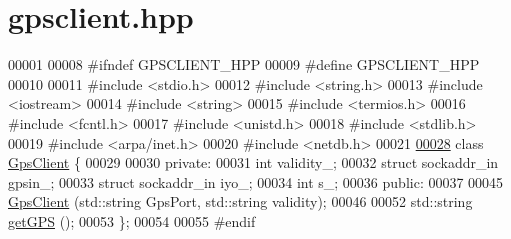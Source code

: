 \hypertarget{gpsclient_8hpp_source}{}\section{gpsclient.\+hpp}
\label{gpsclient_8hpp_source}

\begin{DoxyCode}
00001 
00008 \textcolor{preprocessor}{#ifndef GPSCLIENT\_HPP}
00009 \textcolor{preprocessor}{#define GPSCLIENT\_HPP}
00010 
00011 \textcolor{preprocessor}{#include <stdio.h>}
00012 \textcolor{preprocessor}{#include <string.h>}
00013 \textcolor{preprocessor}{#include <iostream>}
00014 \textcolor{preprocessor}{#include <string>}
00015 \textcolor{preprocessor}{#include <termios.h>}
00016 \textcolor{preprocessor}{#include <fcntl.h>}
00017 \textcolor{preprocessor}{#include <unistd.h>}
00018 \textcolor{preprocessor}{#include <stdlib.h>}
00019 \textcolor{preprocessor}{#include <arpa/inet.h>}
00020 \textcolor{preprocessor}{#include <netdb.h>}
00021 
\hyperlink{classGpsClient}{00028} \textcolor{keyword}{class }\hyperlink{classGpsClient}{GpsClient} \{
00029   
00030  \textcolor{keyword}{private}:
00031   \textcolor{keywordtype}{int} validity\_; 
00032   \textcolor{keyword}{struct }sockaddr\_in gpsin\_; 
00033   \textcolor{keyword}{struct }sockaddr\_in iyo\_; 
00034   \textcolor{keywordtype}{int} s\_; 
00036  \textcolor{keyword}{public}:
00037 
00045   \hyperlink{classGpsClient_aabd8adfb2fd64e34abb77cdae5d60cb5}{GpsClient} (std::string GpsPort, std::string validity); 
00046 
00052   std::string \hyperlink{classGpsClient_ace715e2b156d90e8d0b6cd1a91da4807}{getGPS} ();
00053 \};
00054 
00055 \textcolor{preprocessor}{#endif}
\end{DoxyCode}
